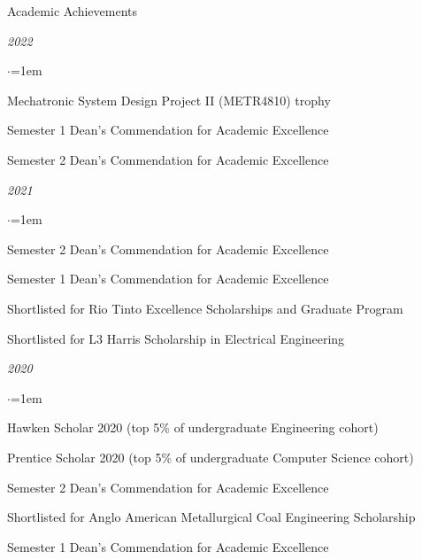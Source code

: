 \documentclass{resume} %
\begin{document}



\newpage

\begin{rSection}{Academic Achievements} \itemsep -2pt
\item \textit{2022}
\begin{list}{$\cdot$}{\leftmargin=1em} %
    \item Mechatronic System Design Project II (METR4810) trophy
    \item Semester 1 Dean's Commendation for Academic Excellence
    \item Semester 2 Dean's Commendation for Academic Excellence
\end{list}

\vspace{1em}

\item \textit{2021}
\begin{list}{$\cdot$}{\leftmargin=1em} %
    \item Semester 2 Dean's Commendation for Academic Excellence
    \item Semester 1 Dean's Commendation for Academic Excellence
    \item Shortlisted for Rio Tinto Excellence Scholarships and Graduate Program
    \item Shortlisted for L3 Harris Scholarship in Electrical Engineering
\end{list}

\vspace{1em}

\item \textit{2020}
\begin{list}{$\cdot$}{\leftmargin=1em} %
    \item Hawken Scholar 2020 (top 5\% of undergraduate Engineering cohort)
    \item Prentice Scholar 2020 (top 5\% of undergraduate Computer Science cohort)
    \item Semester 2 Dean's Commendation for Academic Excellence
    \item Shortlisted for Anglo American Metallurgical Coal Engineering Scholarship
    \item Semester 1 Dean's Commendation for Academic Excellence
\end{list}


\end{rSection}
\end{document}
